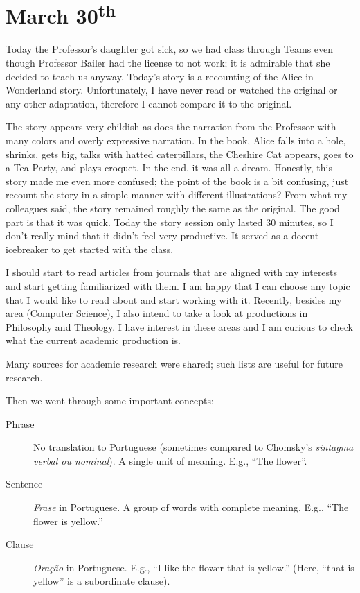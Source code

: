 \section[March 30th]{March 30\textsuperscript{th}}
Today the Professor's daughter got sick, so we had class through Teams even though Professor Bailer had the license to not work; it is admirable that she decided to teach us anyway. Today's story is a recounting of the Alice in Wonderland story. Unfortunately, I have never read or watched the original or any other adaptation, therefore I cannot compare it to the original.

The story appears very childish as does the narration from the Professor with many colors and overly expressive narration. In the book, Alice falls into a hole, shrinks, gets big, talks with hatted caterpillars, the Cheshire Cat appears, goes to a Tea Party, and plays croquet. In the end, it was all a dream. Honestly, this story made me even more confused; the point of the book is a bit confusing, just recount the story in a simple manner with different illustrations? From what my colleagues said, the story remained roughly the same as the original. The good part is that it was quick. Today the story session only lasted 30 minutes, so I don't really mind that it didn't feel very productive. It served as a decent icebreaker to get started with the class.

I should start to read articles from journals that are aligned with my interests and start getting familiarized with them. I am happy that I can choose any topic that I would like to read about and start working with it. Recently, besides my area (Computer Science), I also intend to take a look at productions in Philosophy and Theology. I have interest in these areas and I am curious to check what the current academic production is.

Many sources for academic research were shared; such lists are useful for future research.

Then we went through some important concepts:

\begin{description}
    \item[Phrase] No translation to Portuguese (sometimes compared to Chomsky's \textit{sintagma verbal ou nominal}). A single unit of meaning. E.g., ``The flower''.
    \item[Sentence] \textit{Frase} in Portuguese. A group of words with complete meaning. E.g., ``The flower is yellow.''
    \item[Clause] \textit{Oração} in Portuguese. E.g., ``I like the flower that is yellow.'' (Here, ``that is yellow'' is a subordinate clause).
\end{description}

